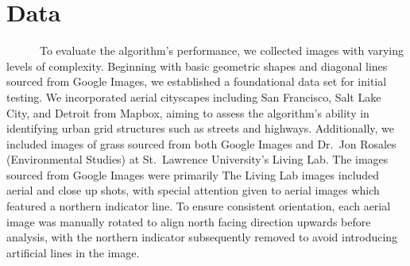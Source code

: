\documentclass[
  letterpaper,
]{report}
\begin{document}

\hypertarget{data}{%
\chapter{Data}\label{data}}

~~~~~~To evaluate the algorithm's performance, we collected images with
varying levels of complexity. Beginning with basic geometric shapes and
diagonal lines sourced from Google Images, we established a foundational
data set for initial testing. We incorporated aerial cityscapes
including San Francisco, Salt Lake City, and Detroit from Mapbox, aiming
to assess the algorithm's ability in identifying urban grid structures
such as streets and highways. Additionally, we included images of grass
sourced from both Google Images and Dr.~Jon Rosales (Environmental
Studies) at St.~Lawrence University's Living Lab. The images sourced
from Google Images were primarily The Living Lab images included aerial
and close up shots, with special attention given to aerial images which
featured a northern indicator line. To ensure consistent orientation,
each aerial image was manually rotated to align north facing direction
upwards before analysis, with the northern indicator subsequently
removed to avoid introducing artificial lines in the image.
\end{document}
